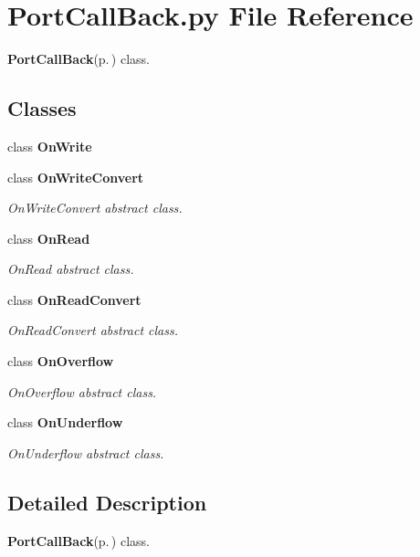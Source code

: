 \section{Port\-Call\-Back.py File Reference}
\label{PortCallBack_8py}
{\bf Port\-Call\-Back}{\rm (p.\,\pageref{namespacePortCallBack})} class. 

\subsection*{Classes}
\begin{CompactItemize}
\item 
class {\bf On\-Write}
\item 
class {\bf On\-Write\-Convert}
\begin{CompactList}\small\item\em On\-Write\-Convert abstract class. \item\end{CompactList}\item 
class {\bf On\-Read}
\begin{CompactList}\small\item\em On\-Read abstract class. \item\end{CompactList}\item 
class {\bf On\-Read\-Convert}
\begin{CompactList}\small\item\em On\-Read\-Convert abstract class. \item\end{CompactList}\item 
class {\bf On\-Overflow}
\begin{CompactList}\small\item\em On\-Overflow abstract class. \item\end{CompactList}\item 
class {\bf On\-Underflow}
\begin{CompactList}\small\item\em On\-Underflow abstract class. \item\end{CompactList}\end{CompactItemize}


\subsection{Detailed Description}
{\bf Port\-Call\-Back}{\rm (p.\,\pageref{namespacePortCallBack})} class. 


